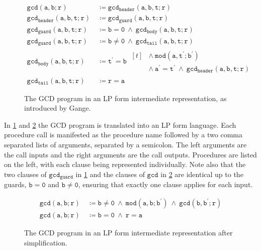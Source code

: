 \begin{figure}[ht]
  \begin{align*}
    \mathtt{gcd(a, b; r)\ }
      & \mathtt{\coloneqq gcd_{header}(a, b, t; r)} \\
    \mathtt{gcd_{header}(a, b, t; r)\ }
      & \mathtt{\coloneqq gcd_{guard}(a, b, t; r)} \\
    \mathtt{gcd_{guard}(a, b, t; r)\ }
      & \mathtt{\coloneqq b = 0\ \land\ gcd_{body}(a, b, t; r)} \\
    \mathtt{gcd_{guard}(a, b, t; r)\ }
      & \mathtt{\coloneqq b \neq 0\ \land\ gcd_{tail}(a, b, t; r)} \\
    \mathtt{gcd_{body}(a, b, t; r)\ }
      & \mathtt{\coloneqq t^\prime = b}\ \begin{aligned}[t]
        & \mathtt{\land\ mod(a, t^\prime; b^\prime)} \\
        & \mathtt{\land\ a^\prime = t^\prime\ \land\ gcd_{header}(a, b, t; r)}
      \end{aligned} \\
    \mathtt{gcd_{tail}(a, b, t; r)\ }
      & \mathtt{\coloneqq r = a} 
  \end{align*}
  \caption[The GCD program in an LP form intermediate representation, as introduced by Gange.]{The GCD program in an LP form intermediate representation, as introduced by Gange.~\cite{gange2015horn}}
  \label{fig:lit-review--gcd-lpvm}
\end{figure}
 
In \cref{fig:lit-review--gcd-lpvm} and \cref{fig:lit-review--gcd-lpvm-simplified} the GCD program is translated into an LP form language. Each procedure call is manifested as the procedure name followed by a two comma separated lists of arguments, separated by a semicolon. The left arguments are the call inputs and the right arguments are the call outputs. Procedures are listed on the left, with each clause being represented individually. Note also that the two clauses of $\mathtt{gcd_{guard}}$ in \cref{fig:lit-review--gcd-lpvm} and the clauses of $\mathtt{gcd}$ in \cref{fig:lit-review--gcd-lpvm-simplified} are identical up to the guards, $\mathtt{b = 0}$ and $\mathtt{b \neq 0}$, ensuring that exactly one clause applies for each input.

\begin{figure}[ht]
  \begin{align*}
    \mathtt{gcd(a, b; r)\ }&\mathtt{\coloneqq b \neq 0\ \land\ mod(a, b; b^\prime)\ \land\ gcd(b, b^\prime; r)} \\
    \mathtt{gcd(a, b; r)\ }&\mathtt{\coloneqq b = 0\ \land\ r = a}
  \end{align*}
  \caption[The GCD program in an LP form intermediate representation after simplification.]{The GCD program in an LP form intermediate representation after simplification.~\cite{gange2015horn}}
  \label{fig:lit-review--gcd-lpvm-simplified}
\end{figure}
 
